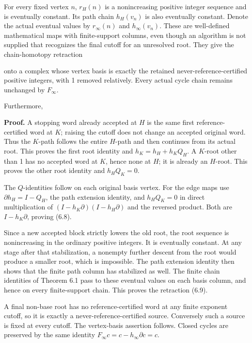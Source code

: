 For every fixed vertex \(n\), \(r_H(n)\) is a nonincreasing positive
integer sequence and is eventually constant. Its path chain \(h_H(v_n)\)
is also eventually constant. Denote the actual eventual values by
\(r_\infty(n)\) and \(h_\infty(v_n)\). These are well-defined
mathematical maps with finite-support columns, even though an algorithm
is not supplied that recognizes the final cutoff for an unresolved root.
They give the chain-homotopy retraction


onto a complex whose vertex basis is exactly the retained
never-reference-certified positive integers, with 1 removed relatively.
Every actual cycle chain remains unchanged by \(F_\infty\).

Furthermore,


\textbf{Proof.} A stopping word already accepted at \(H\) is the same
first reference-certified word at \(K\); raising the cutoff does not
change an accepted original word. Thus the \(K\)-path follows the entire
\(H\)-path and then continues from its actual root. This proves the
first root identity and \(h_K=h_H+h_KQ_H\). A \(K\)-root other than 1
has no accepted word at \(K\), hence none at \(H\); it is already an
\(H\)-root. This proves the other root identity and \(h_HQ_K=0\).

The \(Q\)-identities follow on each original basis vertex. For the edge
maps use \(\partial h_H=I-Q_H\), the path extension identity, and
\(h_HQ_K=0\) in direct multiplication of
\((I-h_K\partial)(I-h_H\partial)\) and the reversed product. Both are
\(I-h_K\partial\), proving (6.8).

Since a new accepted block strictly lowers the old root, the root
sequence is nonincreasing in the ordinary positive integers. It is
eventually constant. At any stage after that stabilization, a nonempty
further descent from the root would produce a smaller root, which is
impossible. The path extension identity then shows that the finite path
column has stabilized as well. The finite chain identities of Theorem
6.1 pass to these eventual values on each basis column, and hence on
every finite-support chain. This proves the retraction (6.9).

A final non-base root has no reference-certified word at any finite
exponent cutoff, so it is exactly a never-reference-certified source.
Conversely such a source is fixed at every cutoff. The vertex-basis
assertion follows. Closed cycles are preserved by the same identity
\(F_\infty c=c-h_\infty\partial c=c\).

